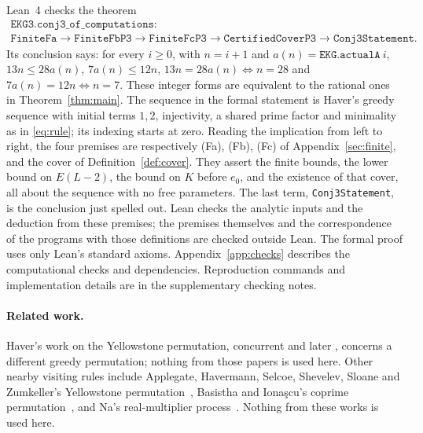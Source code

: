 \documentclass[11pt]{article}
\theoremstyle{definition}
\theoremstyle{remark}
\newcommand{\lean}[1]{\texttt{#1}}
\begin{document}
Lean~4 \cite{lean,mathlib} checks the theorem
\begin{gather*}
 \lean{EKG3.conj3\_of\_computations} :\\
 \lean{FiniteFa}\to\lean{FiniteFbP3}\to\lean{FiniteFcP3}\to
 \lean{CertifiedCoverP3}\to\lean{Conj3Statement}.
\end{gather*}
Its conclusion says: for every $i\ge0$, with $n=i+1$ and
$a(n)=\lean{EKG.actualA}\ i$,
$13n\le28a(n)$, $7a(n)\le12n$, $13n=28a(n)\iff n=28$ and
$7a(n)=12n\iff n=7$. These integer forms are equivalent to the rational
ones in Theorem~\ref{thm:main}. The sequence in the formal statement is
Haver's greedy sequence with initial terms $1,2$, injectivity, a shared prime
factor and minimality as in \eqref{eq:rule}; its indexing starts at zero.
Reading the implication from left to right, the four premises are
respectively (Fa), (Fb), (Fc) of Appendix~\ref{sec:finite}, and the cover of
Definition~\ref{def:cover}. They assert the finite bounds, the lower bound
on $E(L-2)$, the bound on $K$ before $e_0$, and the existence of that
cover, all about the sequence with no free parameters. The last term,
\lean{Conj3Statement}, is the conclusion just spelled out.
Lean checks the analytic inputs and the deduction from these premises;
the premises themselves and the correspondence of the programs with
those definitions are checked outside Lean. The formal proof uses only
Lean's standard axioms. Appendix~\ref{app:checks} describes the computational checks and
dependencies. Reproduction commands and implementation details are in the
supplementary checking notes.

\paragraph{Related work.}
Haver's work on the Yellowstone permutation, concurrent
\cite{haverY3,haverYFrontier} and later \cite{haverY6,haverY7,haverY8}, concerns a different
greedy permutation; nothing from those papers is used here.
Other nearby visiting rules include Applegate, Havermann, Selcoe,
Shevelev, Sloane and Zumkeller's Yellowstone permutation~\cite{yellowstoneOriginal},
Basistha and Iona\c{s}cu's coprime permutation~\cite{basisthaIonascu}, and
Na's real-multiplier process~\cite{naVisiting}. Nothing from these works is used here.
\end{document}
